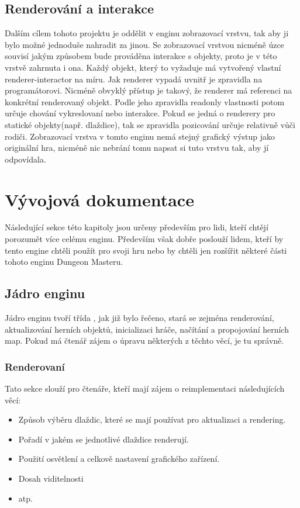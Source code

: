 \section{Renderování a interakce}
Dalším cílem tohoto projektu je oddělit v enginu zobrazovací vrstvu, tak aby ji bylo možné jednoduše nahradit za jinou.
Se zobrazovací vrstvou nicméně úzce souvisí jakým způsobem bude prováděna interakce s objekty, proto je v této vrstvě zahrnuta i ona. 
Každý objekt, který to vyžaduje má vytvořený vlastní renderer-interactor na míru. Jak renderer vypadá uvnitř je zpravidla na programátorovi. 
Nicméně obvyklý přístup je takový, že renderer má referenci na konkrétní renderovaný objekt. Podle jeho zpravidla readonly vlastnosti potom určuje
chování vykreslovaní nebo interakce. Pokud se jedná o renderery pro statické objekty(např. dlaždice), tak se zpravidla pozicování určuje relativně
vůči rodiči. Zobrazovací vrstva v tomto enginu nemá stejný grafický výstup jako originální hra, nicméně nic nebrání tomu napsat 
si tuto vrstvu tak, aby jí odpovídala.

\chapter{Vývojová dokumentace}
Následující sekce této kapitoly jsou určeny především pro lidi, kteří chtějí porozumět více celému enginu. Především
však dobře poslouží lidem, kteří by tento engine chtěli použít pro svoji hru nebo by chtěli jen rozšířit některé části
tohoto enginu Dungeon Masteru.

\section{Jádro enginu}
Jádro enginu tvoří třída , jak již bylo řečeno, stará se zejména renderování, aktualizování herních objektů,
inicializaci hráče, načítání a propojování herních map. Pokud má čtenář zájem o úpravu některých z těchto věcí, je tu správně.

\subsection{Renderovaní}
Tato sekce slouží pro čtenáře, kteří mají zájem o reimplementaci následujících věcí:

\begin{itemize}
\item Způsob výběru dlaždic, které se mají používat pro aktualizaci a rendering.
\item Pořadí v jakém se jednotlivé dlaždice renderují.
\item Použití osvětlení a celkově nastavení grafického zařízení.
\item Dosah viditelnosti
\item atp.
\end{itemize}

